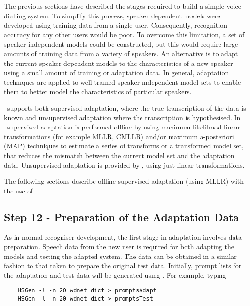 
The previous sections have described the stages required to build a simple 
voice dialling system. To simplify this process, speaker dependent models were 
developed using training data from a single user. Consequently, recognition 
accuracy for any other users would be poor.
To overcome this limitation, a set of speaker independent models could be 
constructed, but this would require large amounts of training data from a 
variety of speakers. An alternative is to adapt the current speaker dependent 
models to the characteristics of a new speaker using a small amount of 
training or adaptation data. In general, adaptation 
techniques are applied to well trained speaker independent model sets to 
enable them to better model the characteristics of particular speakers.

\HTK\ supports both supervised adaptation, 
where the true transcription of the data is known and unsupervised 
adaptation where the
transcription is hypothesised.
In \HTK\ supervised adaptation is performed offline by
 using maximum likelihood linear transformations
(for example MLLR, CMLLR) 
and/or maximum a-posteriori (MAP) techniques to 
estimate
a series of transforms or a transformed model set, that reduces the mismatch 
between the current model set and the adaptation data. Unsupervised 
adaptation is provided by , using just linear transformations.

The following sections describe offline supervised adaptation (using
MLLR) with the use of .

\subsection{Step 12 - Preparation of the Adaptation Data}

As in normal recogniser development, the first stage in adaptation involves 
data preparation. Speech data from the new user is required for both adapting 
the models and testing the adapted system. The data can be obtained in a 
similar fashion to that taken to prepare the original test data.
Initially, prompt lists for the adaptation and test data will be generated using 
. For example, typing

\begin{verbatim}
    HSGen -l -n 20 wdnet dict > promptsAdapt
    HSGen -l -n 20 wdnet dict > promptsTest
\end{verbatim}

